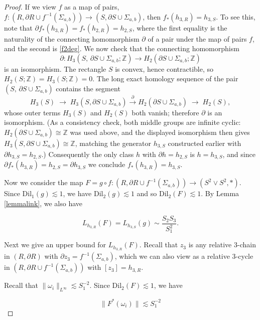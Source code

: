 \documentclass{amsart}
\newtheorem*{theorem 1}{Theorem 1}
\newtheorem*{theorem 2}{Theorem 2}
\newtheorem*{theorem 3}{Theorem 3}
\numberwithin{equation}{section}
\newcommand{\Dil}{\textrm{Dil}}
\newcommand{\ZZ}{\mathbb{Z}}
\begin{document}
\begin{proof}
If we view $f$ as a map of pairs,  $f: (R,  \partial R \cup f^{-1} (\Sigma_{a,b})) \rightarrow (S,  \partial S \cup \Sigma_{a,b})$,  then $f_*(h_{3,R}) = h_{3,S}$.   To see this,  note that  $\partial f_*(h_{3,R}) = f_*(h_{2,R}) = h_{2, S}$, where the first equality is the naturality of the connecting homomorphism $\partial$ of a pair under the map of pairs $f$, and the second is \eqref{f2deg}.  We now check that the connecting homomorphism
$$ \partial : H_3(S,\,\partial S\cup\Sigma_{a,b};\ZZ) \longrightarrow H_2(\partial S\cup\Sigma_{a,b};\ZZ) $$
is an isomorphism.  The rectangle $S$ is convex, hence contractible, so $H_2(S;\ZZ)=H_3(S;\ZZ)=0$.  The long exact homology sequence of the pair $(S,\,\partial S\cup\Sigma_{a,b})$ contains the segment
$$ H_3(S) \;\longrightarrow\; H_3(S,\partial S\cup\Sigma_{a,b}) \xrightarrow{\ \partial\ } H_2(\partial S\cup\Sigma_{a,b}) \;\longrightarrow\; H_2(S), $$
whose outer terms $H_3(S)$ and $H_2(S)$ both vanish; therefore $\partial$ is an isomorphism.  (As a consistency check, both middle groups are infinite cyclic: $H_2(\partial S\cup\Sigma_{a,b})\cong\ZZ$ was used above, and the displayed isomorphism then gives $H_3(S,\partial S\cup\Sigma_{a,b})\cong\ZZ$, matching the generator $h_{3,S}$ constructed earlier with $\partial h_{3,S}=h_{2,S}$.)  Consequently the only class $h$ with $\partial h = h_{2,S}$ is $h = h_{3,S}$, and since $\partial f_*(h_{3,R}) = h_{2,S} = \partial h_{3,S}$ we conclude $f_*(h_{3,R}) = h_{3,S}$.   

Now we consider the map $F = g \circ f: (R, \partial R \cup f^{-1}(\Sigma_{a,b}))  \rightarrow (S^2 \vee S^2, *)$.   Since $\Dil_1(g) \lesssim 1$,  we have $\Dil_2(g) \lesssim 1$ and so $\Dil_2( F) \lesssim 1$.   By Lemma \ref{lemmalink},  we also have

\begin{equation} \label{linkF} L_{h_{3,R}}(F) = L_{h_{3,S}}(g) \sim \frac{ S_2 S_3}{S_1^2}.  \end{equation}

Next we give an upper bound for $L_{h_{3,R}}(F)$.   Recall that $z_3$ is any relative 3-chain in $(R,  \partial R)$ with $\partial z_3 = f^{-1}(\Sigma_{a,b})$,  which we can also view as a relative  3-cycle in $(R,   \partial R \cup f^{-1}(\Sigma_{a,b}))$ with $[z_3] = h_{3, R}$.   

Recall that $\| \omega_i \|_{L^\infty} \lesssim S_1^{-2}$.   Since $\Dil_2(F) \lesssim 1$,  we have

\begin{equation}
\| F^* (\omega_i) \| \lesssim S_1^{-2}
\end{equation}


\end{proof}
\end{document}

